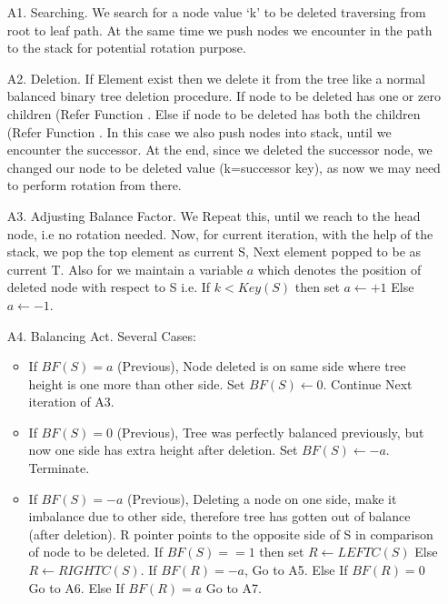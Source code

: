 \documentclass{article}
\begin{document}
\begin{itemize}
    \item[A1.] Searching. We search for a node value `k' to be deleted traversing from root to leaf path. At the same time we push nodes we encounter in the path to the stack for potential rotation purpose.
    \item[A2.] Deletion. If Element exist then we delete it from the tree like a normal balanced binary tree deletion procedure. \newline
    If node to be deleted has one or zero children (Refer Function .   \newline
    Else if node to be deleted has both the children (Refer Function . In this case we also push nodes into stack, until we encounter the successor. At the end, since we deleted the successor node, we changed our node to be deleted value (k=successor key), as now we may need to perform rotation from there.
    
    \item[A3.] Adjusting Balance Factor. We Repeat this, until we reach to the head node, i.e no rotation needed. \newline 
    Now, for current iteration, with the help of the stack, we pop the top element as current S, Next element popped to be as current T. \newline
    Also for we maintain a variable $a$ which denotes the position of deleted node with respect to S i.e. If $k < Key(S) $ then set $a \leftarrow +1$ Else $a \leftarrow -1$. 
    
    \item[A4.] Balancing Act. Several Cases:
	    \begin{itemize}
             \item If $BF(S) = a$ (Previous), Node deleted is on same side where tree height is one more than other side. Set $BF(S) \leftarrow 0$. Continue Next iteration of A3.
             \item If $BF(S) = 0$ (Previous), Tree was perfectly balanced previously, but now one side has extra height after deletion. Set $BF(S) \leftarrow -a$. Terminate.
             \item If $BF(S) = -a$ (Previous), Deleting a node on one side, make it imbalance due to other side, therefore tree has gotten out of balance (after deletion).
             \newline
             R pointer points to the opposite side of S in comparison of node to be deleted.
             If $BF(S) == 1 $ then set $R \leftarrow LEFTC(S)$ Else $R \leftarrow RIGHTC(S)$.
             \newline
             If $BF(R) = -a$, Go to A5. Else If $BF(R) = 0$ Go to A6. Else If $BF(R) = a$ Go to A7.
       \end{itemize}
       

\end{itemize}
\end{document}
